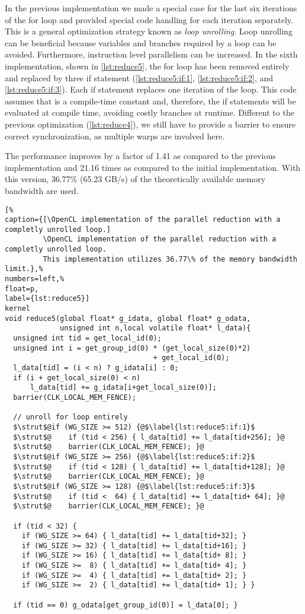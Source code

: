 In the previous implementation we made a special case for the last six iterations of the for loop and provided special code handling for each iteration separately.
This is a general optimization strategy known as \emph{loop unrolling}.
Loop unrolling can be beneficial because variables and branches required by a loop can be avoided.
Furthermore, instruction level parallelism can be increased.
In the sixth implementation, shown in \autoref{lst:reduce5}, the for loop has been removed entirely and replaced by three if statement (\autoref{lst:reduce5:if:1}, \autoref{lst:reduce5:if:2}, and \autoref{lst:reduce5:if:3}).
Each if statement replaces one iteration of the loop.
This code assumes that  is a compile-time constant and, therefore, the if statements will be evaluated at compile time, avoiding costly branches at runtime.
Different to the previous optimization (\autoref{lst:reduce4}), we still have to provide a barrier to ensure correct synchronization, as multiple warps are involved here.

The performance improves by a factor of 1.41 as compared to the previous implementation and 21.16 times as compared to the initial implementation.
With this version, 36.77\% (65.23 GB/s) of the theoretically available memory bandwidth are used.

\begin{lstlisting}[%
caption={[\OpenCL implementation of the parallel reduction with a completly unrolled loop.]
         \OpenCL implementation of the parallel reduction with a completly unrolled loop.
         This implementation utilizes 36.77\% of the memory bandwidth limit.},%
numbers=left,%
float=p,
label={lst:reduce5}]
kernel
void reduce5(global float* g_idata, global float* g_odata,
             unsigned int n,local volatile float* l_data){
  unsigned int tid = get_local_id(0);
  unsigned int i = get_group_id(0) * (get_local_size(0)*2)
                                   + get_local_id(0);
  l_data[tid] = (i < n) ? g_idata[i] : 0;
  if (i + get_local_size(0) < n)
      l_data[tid] += g_idata[i+get_local_size(0)];
  barrier(CLK_LOCAL_MEM_FENCE);

  // unroll for loop entirely
  $\strut$@if (WG_SIZE >= 512) {@$\label{lst:reduce5:if:1}$
  $\strut$@    if (tid < 256) { l_data[tid] += l_data[tid+256]; }@
  $\strut$@    barrier(CLK_LOCAL_MEM_FENCE); }@
  $\strut$@if (WG_SIZE >= 256) {@$\label{lst:reduce5:if:2}$
  $\strut$@    if (tid < 128) { l_data[tid] += l_data[tid+128]; }@
  $\strut$@    barrier(CLK_LOCAL_MEM_FENCE); }@
  $\strut$@if (WG_SIZE >= 128) {@$\label{lst:reduce5:if:3}$
  $\strut$@    if (tid <  64) { l_data[tid] += l_data[tid+ 64]; }@
  $\strut$@    barrier(CLK_LOCAL_MEM_FENCE); }@

  if (tid < 32) {
    if (WG_SIZE >= 64) { l_data[tid] += l_data[tid+32]; }
    if (WG_SIZE >= 32) { l_data[tid] += l_data[tid+16]; }
    if (WG_SIZE >= 16) { l_data[tid] += l_data[tid+ 8]; }
    if (WG_SIZE >=  8) { l_data[tid] += l_data[tid+ 4]; }
    if (WG_SIZE >=  4) { l_data[tid] += l_data[tid+ 2]; }
    if (WG_SIZE >=  2) { l_data[tid] += l_data[tid+ 1]; } }

  if (tid == 0) g_odata[get_group_id(0)] = l_data[0]; }
\end{lstlisting}


